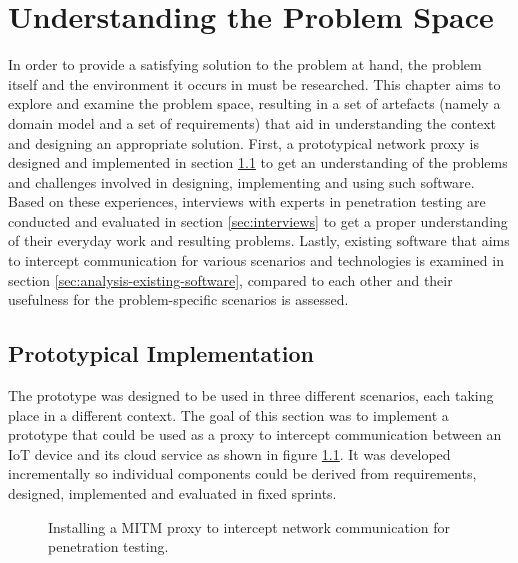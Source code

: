 \chapter{Understanding the Problem Space}
\label{chap:understanding-the-problem-space}
In order to provide a satisfying solution to the problem at hand, the problem itself and the environment it occurs in must be researched. This chapter aims to explore and examine the problem space, resulting in a set of artefacts (namely a domain model and a set of requirements) that aid in understanding the context and designing an appropriate solution. First, a prototypical network proxy is designed and implemented in section \ref{sec:prototypical-implementation} to get an understanding of the problems and challenges involved in designing, implementing and using such software. Based on these experiences, interviews with experts in penetration testing are conducted and evaluated in section \ref{sec:interviews} to get a proper understanding of their everyday work and resulting problems. Lastly, existing software that aims to intercept communication for various scenarios and technologies is examined in section \ref{sec:analysis-existing-software}, compared to each other and their usefulness for the problem-specific scenarios is assessed.

\section{Prototypical Implementation}
\label{sec:prototypical-implementation}
The prototype was designed to be used in three different scenarios, each taking place in a different context. The goal of this section was to implement a prototype that could be used as a proxy to intercept communication between an \ac{IoT} device and its cloud service as shown in figure \ref{fig:network-communication-diagrams}. It was developed incrementally so individual components could be derived from requirements, designed, implemented and evaluated in fixed sprints.

\begin{figure}%
    \centering
    \qquad
    \caption{Installing a \ac{MITM} proxy to intercept network communication for penetration testing.}%
    \label{fig:network-communication-diagrams}%
\end{figure}

